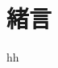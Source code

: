 \documentclass[main]{subfiles}
\begin{document}
\chapter{緒言}
hh \cite{ref:mnih2013playing}
\end{document}
